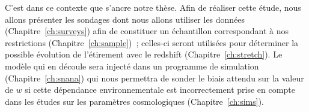 \documentclass[../main/main.tex]{subfiles}
\begin{document}
C'est dans ce contexte que s'ancre notre thèse. Afin de réaliser cette étude,
nous allons présenter les sondages dont nous allons utiliser les données
(Chapitre~\ref{ch:surveys}) afin de constituer un échantillon correspondant à
nos restrictions (Chapitre~\ref{ch:sample})~; celles-ci seront utilisées pour
déterminer la possible évolution de l'étirement avec le redshift
(Chapitre~\ref{ch:stretch}). Le modèle qui en découle sera injecté dans un
programme de simulation (Chapitre~\ref{ch:snana}) qui nous permettra de sonder
le biais attendu sur la valeur de $w$ si cette dépendance environnementale est
incorrectement prise en compte dans les études sur les paramètres cosmologiques
(Chapitre~\ref{ch:sims}).

\clearpage

\thispagestyle{plain}
\vfill
\minilof
\vfill
\minilot
\vfill

% 
% 
\end{document}
